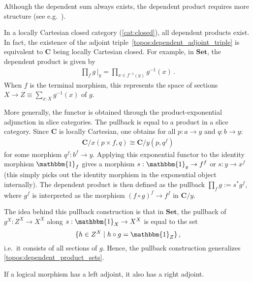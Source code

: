     Although the dependent sum always exists, the dependent product requires more structure (see e.g.~\citet{huang_locally_2022}).
    \begin{property}
        In a locally Cartesian closed category (\cref{cat:closed}), all dependent products exist. In fact, the existence of the adjoint triple~\eqref{topos:dependent_adjoint_triple} is equivalent to $\mathbf{C}$ being locally Cartesian closed. For example, in $\mathbf{Set}$, the dependent product is given by
        \begin{gather}
            \label{topos:dependent_product_sets}
            \prod_fg\,\Big|_y=\prod_{x\in f^{-1}(y)}g^{-1}(x)\,.
        \end{gather}
        When $f$ is the terminal morphism, this represents the space of sections $X\rightarrow Z\equiv\sum_{x:X}g^{-1}(x)$ of $g$.

        More generally, the functor is obtained through the product-exponential adjunction in slice categories. The pullback is equal to a product in a slice category. Since $\mathbf{C}$ is locally Cartesian, one obtains for all $p:a\rightarrow y$ and $q:b\rightarrow y$:
        \begin{gather}
            \mathbf{C}/x(p\times f,q)\cong\mathbf{C}/y(p,q^f)
        \end{gather}
        for some morphism $q^f:b^f\rightarrow y$. Applying this exponential functor to the identity morphism $\mathbbm{1}_f$ gives a morphism $s:\mathbbm{1}_y\rightarrow f^f$ or $s:y\rightarrow x^f$ (this simply picks out the identity morphism in the exponential object internally). The dependent product is then defined as the pullback $\prod_fg:=s^*g^f$, where $g^f$ is interpreted as the morphism $(f\circ g)^f\rightarrow f^f$ in $\mathbf{C}/y$.

        The idea behind this pullback construction is that in $\mathbf{Set}$, the pullback of $g^X:Z^X\rightarrow X^X$ along $s:\mathbbm{1}_X\rightarrow X^X$ is equal to the set \[\{h\in Z^X\mid h\circ g=\mathbbm{1}_Z\}\,,\] i.e.~it consists of all sections of $g$. Hence, the pullback construction generalizes \cref{topos:dependent_product_sets}.
    \end{property}

    \begin{property}
        If a logical morphism has a left adjoint, it also has a right adjoint.
    \end{property}


